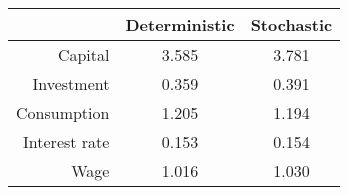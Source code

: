 \begin{center}
\begin{tabular}{r c c}
& Deterministic & Stochastic \\ \hline
Capital  & 3.585 & 3.781  \\ 
Investment & 0.359 & 0.391  \\ 
Consumption & 1.205 & 1.194  \\ 
Interest rate & 0.153 & 0.154 \\ 
Wage & 1.016 & 1.030 \\ \hline
\end{tabular}
\end{center}